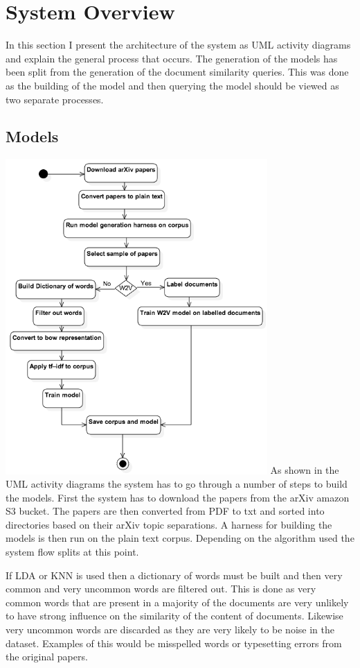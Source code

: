\section{System Overview}
In this section I present the architecture of the system as UML activity diagrams and explain the general process that occurs.
The generation of the models has been split from the generation of the document similarity queries.
This was done as the building of the model and then querying the model should be viewed as two separate processes.

\subsection{Models}
\includegraphics[width=10cm]{Figures/ArchictectureBuildingUML.png}
As shown in the UML activity diagrams the system has to go through a number of steps to build the models.
First the system has to download the papers from the arXiv amazon S3 bucket.
The papers are then converted from PDF to txt and sorted into directories based on their arXiv topic separations.
A harness for building the models is then run on the plain text corpus.
Depending on the algorithm used the system flow splits at this point.

If LDA or KNN is used then a dictionary of words must be built and then very common and very uncommon words are filtered out.
This is done as very common words that are present in a majority of the documents are very unlikely to have strong influence on the similarity of the content of documents.
Likewise very uncommon words are discarded as they are very likely to be noise in the dataset.
Examples of this would be misspelled words or typesetting errors from the original papers.

